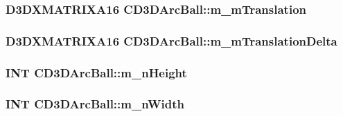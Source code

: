 \label{class_c_d3_d_arc_ball_a02619e72fe82db21a3c237a94eb31a37}
\hypertarget{class_c_d3_d_arc_ball_a2d9f13c59ac72cec38ab704159b7e4e9}{
\subsubsection[{m\_\-mTranslation}]{\setlength{\rightskip}{0pt plus 5cm}D3DXMATRIXA16 {\bf CD3DArcBall::m\_\-mTranslation}}}
\label{class_c_d3_d_arc_ball_a2d9f13c59ac72cec38ab704159b7e4e9}
\hypertarget{class_c_d3_d_arc_ball_ad630f2a7fc9ca7f77574ba9e9560c672}{
\subsubsection[{m\_\-mTranslationDelta}]{\setlength{\rightskip}{0pt plus 5cm}D3DXMATRIXA16 {\bf CD3DArcBall::m\_\-mTranslationDelta}}}
\label{class_c_d3_d_arc_ball_ad630f2a7fc9ca7f77574ba9e9560c672}
\hypertarget{class_c_d3_d_arc_ball_a53bb3eeba4a817148421c5c53b4b846d}{
\subsubsection[{m\_\-nHeight}]{\setlength{\rightskip}{0pt plus 5cm}INT {\bf CD3DArcBall::m\_\-nHeight}}}
\label{class_c_d3_d_arc_ball_a53bb3eeba4a817148421c5c53b4b846d}
\hypertarget{class_c_d3_d_arc_ball_a71b658e5247eb150029dfe923bd116c3}{
\subsubsection[{m\_\-nWidth}]{\setlength{\rightskip}{0pt plus 5cm}INT {\bf CD3DArcBall::m\_\-nWidth}}}
\label{class_c_d3_d_arc_ball_a71b658e5247eb150029dfe923bd116c3}

